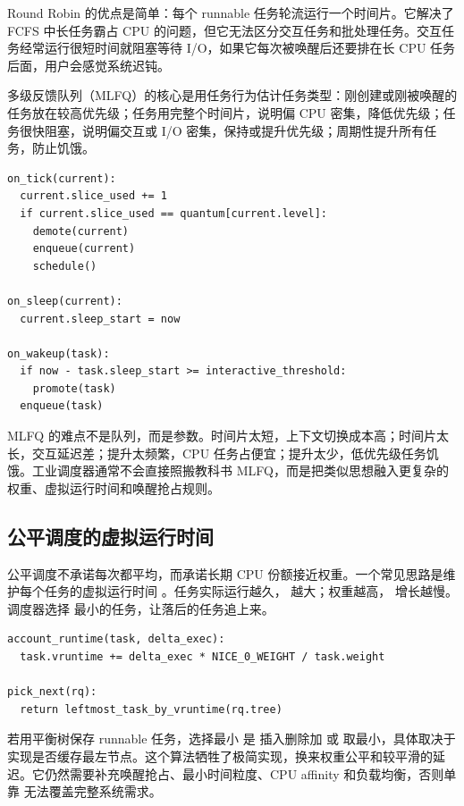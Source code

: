 Round Robin 的优点是简单：每个 runnable 任务轮流运行一个时间片。它解决了 FCFS 中长任务霸占 CPU 的问题，但它无法区分交互任务和批处理任务。交互任务经常运行很短时间就阻塞等待 I/O，如果它每次被唤醒后还要排在长 CPU 任务后面，用户会感觉系统迟钝。

多级反馈队列（MLFQ）的核心是用任务行为估计任务类型：刚创建或刚被唤醒的任务放在较高优先级；任务用完整个时间片，说明偏 CPU 密集，降低优先级；任务很快阻塞，说明偏交互或 I/O 密集，保持或提升优先级；周期性提升所有任务，防止饥饿。

\begin{lstlisting}
on_tick(current):
  current.slice_used += 1
  if current.slice_used == quantum[current.level]:
    demote(current)
    enqueue(current)
    schedule()

on_sleep(current):
  current.sleep_start = now

on_wakeup(task):
  if now - task.sleep_start >= interactive_threshold:
    promote(task)
  enqueue(task)
\end{lstlisting}

MLFQ 的难点不是队列，而是参数。时间片太短，上下文切换成本高；时间片太长，交互延迟差；提升太频繁，CPU 任务占便宜；提升太少，低优先级任务饥饿。工业调度器通常不会直接照搬教科书 MLFQ，而是把类似思想融入更复杂的权重、虚拟运行时间和唤醒抢占规则。

\subsection{公平调度的虚拟运行时间}

公平调度不承诺每次都平均，而承诺长期 CPU 份额接近权重。一个常见思路是维护每个任务的虚拟运行时间 。任务实际运行越久， 越大；权重越高， 增长越慢。调度器选择  最小的任务，让落后的任务追上来。

\begin{lstlisting}
account_runtime(task, delta_exec):
  task.vruntime += delta_exec * NICE_0_WEIGHT / task.weight

pick_next(rq):
  return leftmost_task_by_vruntime(rq.tree)
\end{lstlisting}

若用平衡树保存 runnable 任务，选择最小  是  插入删除加  或  取最小，具体取决于实现是否缓存最左节点。这个算法牺牲了极简实现，换来权重公平和较平滑的延迟。它仍然需要补充唤醒抢占、最小时间粒度、CPU affinity 和负载均衡，否则单靠  无法覆盖完整系统需求。

